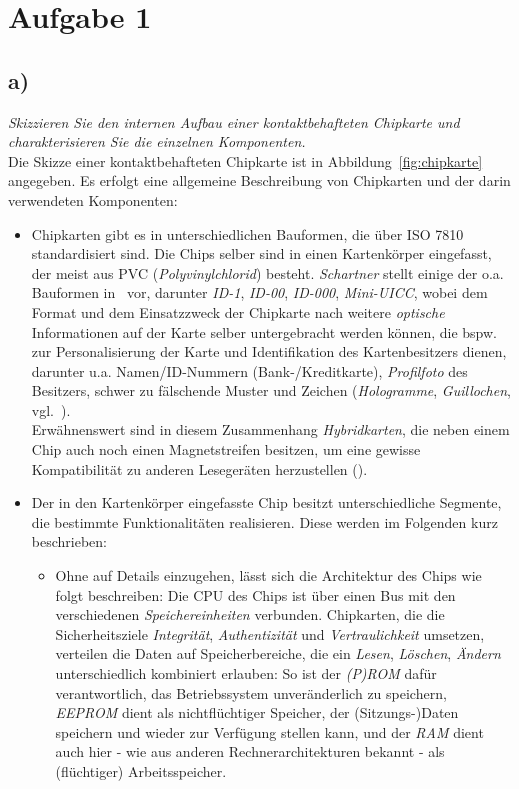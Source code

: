 \chapter{Aufgabe 1}

\section{a)}
\textit{Skizzieren Sie den internen Aufbau einer kontaktbehafteten Chipkarte und charakterisieren Sie die einzelnen Komponenten.}\\

\noindent
Die Skizze einer kontaktbehafteten Chipkarte ist in Abbildung~\ref{fig:chipkarte} angegeben.
Es erfolgt eine allgemeine Beschreibung von Chipkarten und der darin verwendeten Komponenten:

\begin{itemize}
    \itemsep0.5em
    \item Chipkarten gibt es in unterschiedlichen Bauformen, die über ISO 7810 standardisiert sind.
    Die Chips selber sind in einen Kartenkörper eingefasst, der meist aus PVC (\textit{Polyvinylchlorid}) besteht.
    \textit{Schartner} stellt einige der o.a. Bauformen in~\cite[]{ITS5} vor, darunter \textit{ID-1}, \textit{ID-00}, \textit{ID-000}, \textit{Mini-UICC}, wobei dem Format und dem Einsatzzweck der Chipkarte nach weitere \textit{optische} Informationen auf der Karte selber untergebracht werden können, die bspw. zur Personalisierung der Karte und Identifikation des Kartenbesitzers dienen, darunter u.a. Namen/ID-Nummern (Bank-/Kreditkarte), \textit{Profilfoto} des Besitzers, schwer zu fälschende Muster und Zeichen (\textit{Hologramme}, \textit{Guillochen}, vgl.~\cite[74]{ITS5}).\\
    Erwähnenswert sind in diesem Zusammenhang \textit{Hybridkarten}, die neben einem Chip auch noch einen Magnetstreifen besitzen, um eine gewisse Kompatibilität zu anderen Lesegeräten herzustellen (\cite[4]{ITS5}).

    \item Der in den Kartenkörper eingefasste Chip besitzt unterschiedliche Segmente, die bestimmte Funktionalitäten realisieren.
    Diese werden im Folgenden kurz beschrieben:
    \begin{itemize}
        \item Ohne auf Details einzugehen, lässt sich die Architektur des Chips wie folgt beschreiben: Die CPU des Chips ist über einen Bus mit den verschiedenen \textit{Speichereinheiten} verbunden. Chipkarten, die die Sicherheitsziele \textit{Integrität}, \textit{Authentizität} und \textit{Vertraulichkeit} umsetzen, verteilen die Daten auf Speicherbereiche, die ein \textit{Lesen}, \textit{Löschen}, \textit{Ändern} unterschiedlich kombiniert erlauben: So ist der \textit{(P)ROM} dafür verantwortlich, das Betriebssystem unveränderlich zu speichern, \textit{EEPROM} dient als nichtflüchtiger Speicher, der (Sitzungs-)Daten speichern und wieder zur Verfügung stellen kann, und der \textit{RAM} dient auch hier - wie aus anderen Rechnerarchitekturen bekannt - als (flüchtiger) Arbeitsspeicher.


\end{itemize}
\end{itemize}
